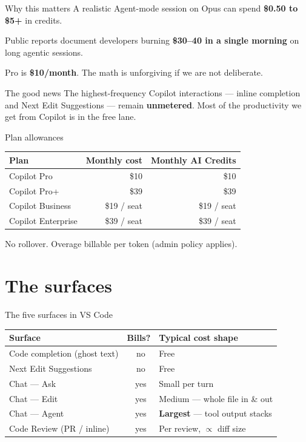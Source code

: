 \documentclass[11pt,aspectratio=169]{beamer}
\newcommand{\good}{\textcolor{successgreen}{\checkmark}}
\newcommand{\bad}{\textcolor{warningred}{\textbf{\texttimes}}}
\newcommand{\hl}[1]{\textbf{\textcolor{accentblue}{#1}}}
\begin{document}
\begin{frame}{Why this matters}
  A realistic Agent-mode session on Opus can spend \hl{\$0.50 to \$5+} in credits.

  \medskip
  Public reports document developers burning \hl{\$30--40 in a single morning} on long agentic sessions.

  \medskip
  Pro is \hl{\$10/month}. The math is unforgiving if we are not deliberate.

  \vfill
  \begin{alertblock}{The good news}
    The highest-frequency Copilot interactions --- inline completion and Next Edit Suggestions --- remain \hl{unmetered}. Most of the productivity we get from Copilot is in the free lane.
  \end{alertblock}
\end{frame}

\begin{frame}{Plan allowances}
  \centering
  \begin{tabular}{lrr}
    \toprule
    \textbf{Plan} & \textbf{Monthly cost} & \textbf{Monthly AI Credits} \\
    \midrule
    Copilot Pro            & \$10        & \$10 \\
    Copilot Pro+           & \$39        & \$39 \\
    Copilot Business       & \$19 / seat & \$19 / seat \\
    Copilot Enterprise     & \$39 / seat & \$39 / seat \\
    \bottomrule
  \end{tabular}

  \vfill
  \small No rollover. Overage billable per token (admin policy applies).
\end{frame}

\section{The surfaces}

\begin{frame}{The five surfaces in VS Code}
  \centering\small
  \begin{tabular}{lcl}
    \toprule
    \textbf{Surface} & \textbf{Bills?} & \textbf{Typical cost shape} \\
    \midrule
    Code completion (ghost text)        & \good\ no  & Free \\
    Next Edit Suggestions               & \good\ no  & Free \\
    Chat --- Ask                        & \bad\ yes  & Small per turn \\
    Chat --- Edit                       & \bad\ yes  & Medium --- whole file in \& out \\
    Chat --- Agent                      & \bad\ yes  & \hl{Largest} --- tool output stacks \\
    Code Review (PR / inline)           & \bad\ yes  & Per review, $\propto$ diff size \\
    \bottomrule
  \end{tabular}
\end{frame}
\end{document}
